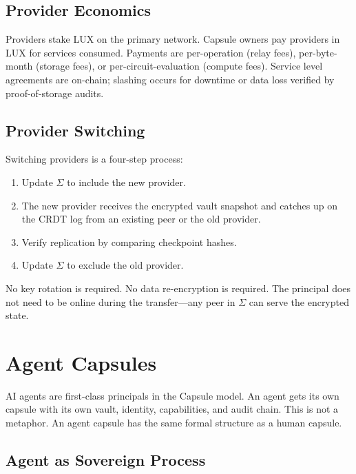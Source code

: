 \documentclass[11pt,a4paper]{article}
\begin{document}
\subsection{Provider Economics}

Providers stake LUX on the primary network. Capsule owners pay providers in LUX
for services consumed. Payments are per-operation (relay fees), per-byte-month
(storage fees), or per-circuit-evaluation (compute fees). Service level
agreements are on-chain; slashing occurs for downtime or data loss verified
by proof-of-storage audits.

\subsection{Provider Switching}

Switching providers is a four-step process:
\begin{enumerate}[nosep]
  \item Update $\Sigma$ to include the new provider.
  \item The new provider receives the encrypted vault snapshot and catches up
        on the CRDT log from an existing peer or the old provider.
  \item Verify replication by comparing checkpoint hashes.
  \item Update $\Sigma$ to exclude the old provider.
\end{enumerate}

No key rotation is required. No data re-encryption is required. The principal
does not need to be online during the transfer---any peer in $\Sigma$ can serve
the encrypted state.

\section{Agent Capsules}\label{sec:agents}

AI agents are first-class principals in the Capsule model. An agent gets its
own capsule with its own vault, identity, capabilities, and audit chain.
This is not a metaphor. An agent capsule has the same formal structure as a
human capsule.

\subsection{Agent as Sovereign Process}
\end{document}

